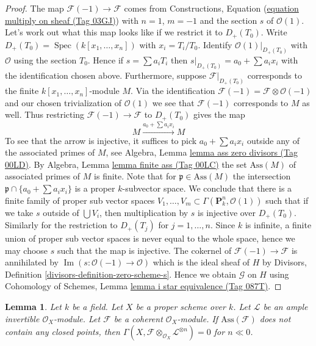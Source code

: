 \documentclass{amsart}
\theoremstyle{plain}
\newtheorem{lemma}[subsection]{Lemma}
\theoremstyle{definition}
\theoremstyle{remark}
\numberwithin{equation}{subsection}
\def\Spec{\mathop{\mathrm{Spec}}}
\def\Im{\mathop{\mathrm{Im}}}
\begin{document}
\begin{proof}
The map $\mathcal{F}(-1) \to \mathcal{F}$ comes from
Constructions, Equation (\href{https://stacks.math.columbia.edu/tag/03GJ}{equation multiply on sheaf (Tag 03GJ)})
with $n = 1$, $m = -1$ and the section $s$ of $\mathcal{O}(1)$.
Let's work out what this map looks like if we restrict it to
$D_{+}(T_0)$. Write $D_{+}(T_0) = \Spec(k[x_1, \ldots, x_n])$
with $x_i = T_i/T_0$. Identify $\mathcal{O}(1)|_{D_{+}(T_0)}$ with
$\mathcal{O}$ using the section $T_0$. Hence if
$s = \sum a_iT_i$ then $s|_{D_{+}(T_0)} = a_0 + \sum a_ix_i$
with the identification chosen above. Furthermore, suppose
$\mathcal{F}|_{D_{+}(T_0)}$ corresponds to the finite
$k[x_1, \ldots, x_n]$-module $M$. Via the identification
$\mathcal{F}(-1) = \mathcal{F} \otimes \mathcal{O}(-1)$
and our chosen trivialization of $\mathcal{O}(1)$ we see that
$\mathcal{F}(-1)$ corresponds to $M$ as well. Thus
restricting $\mathcal{F}(-1) \to \mathcal{F}$ to $D_{+}(T_0)$ gives
the map
$$
M \xrightarrow{a_0 + \sum a_ix_i} M
$$
To see that the arrow is injective, it suffices to pick
$a_0 + \sum a_ix_i$ outside any of the associated primes of $M$, see
Algebra, Lemma \href{https://stacks.math.columbia.edu/tag/00LD}{lemma ass zero divisors (Tag 00LD)}. By
Algebra, Lemma \href{https://stacks.math.columbia.edu/tag/00LC}{lemma finite ass (Tag 00LC)}
the set $\text{Ass}(M)$ of associated primes of $M$ is finite.
Note that for $\mathfrak p \in \text{Ass}(M)$ the intersection
$\mathfrak p \cap \{a_0 + \sum a_i x_i\}$ is a proper $k$-subvector space.
We conclude that there is a finite family of proper sub vector spaces
$V_1, \ldots, V_m \subset \Gamma(\mathbf{P}^n_k, \mathcal{O}(1))$
such that if we take $s$ outside of $\bigcup V_i$, then multiplication
by $s$ is injective over $D_{+}(T_0)$.
Similarly for the restriction to $D_{+}(T_j)$ for $j = 1, \ldots, n$.
Since $k$ is infinite, a finite union of proper sub vector spaces
is never equal to the whole space, hence we may choose $s$ such
that the map is injective.
The cokernel of $\mathcal{F}(-1) \to \mathcal{F}$ is annihilated
by $\Im(s : \mathcal{O}(-1) \to \mathcal{O})$ which is
the ideal sheaf of $H$ by
Divisors, Definition \ref{divisors-definition-zero-scheme-s}.
Hence we obtain $\mathcal{G}$ on $H$ using
Cohomology of Schemes, Lemma \href{https://stacks.math.columbia.edu/tag/087T}{lemma i star equivalence (Tag 087T)}.
\end{proof}


\begin{lemma}
\label{lemma-vanishin-h0-negative}
Let $k$ be a field. Let $X$ be a proper scheme over $k$. Let $\mathcal{L}$
be an ample invertible $\mathcal{O}_X$-module. Let $\mathcal{F}$ be a
coherent $\mathcal{O}_X$-module. If $\text{Ass}(\mathcal{F})$ does not
contain any closed points, then
$\Gamma(X, \mathcal{F} \otimes_{\mathcal{O}_X} \mathcal{L}^{\otimes n}) = 0$
for $n \ll 0$.
\end{lemma}
\end{document}
